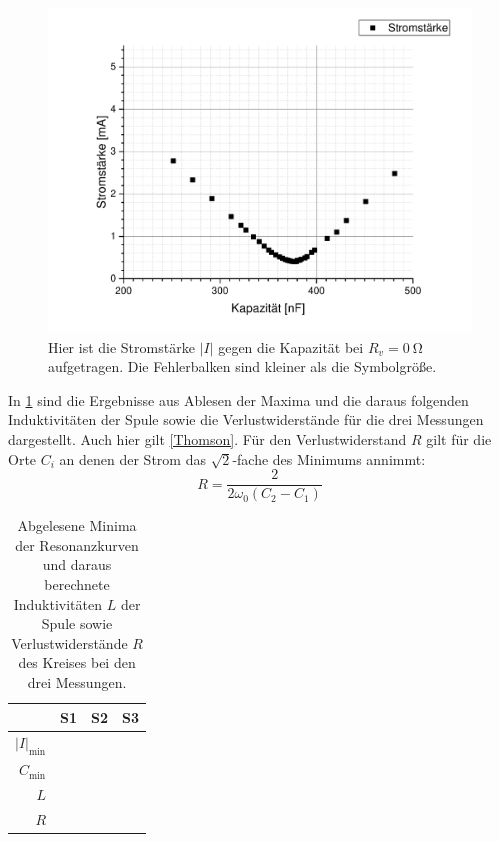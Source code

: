 \documentclass[
	a4paper,
	12pt,
	pagesize,
	ngerman
]{scrartcl}
\begin{document}
	\begin{figure}[H]
		\includegraphics[width=1\textwidth]{Parallelstromkreis_inf}
		\centering
		\caption{Hier ist die Stromstärke $ \left| I \right| $ gegen die Kapazität bei $ R_v = \SI{0}{\ohm} $ aufgetragen. Die Fehlerbalken sind kleiner als die Symbolgröße.}
		\label{Para_inf}
		\centering
	\end{figure}
	
	In \cref{Para_Erg} sind die Ergebnisse aus Ablesen der Maxima und die daraus folgenden Induktivitäten der Spule sowie die Verlustwiderstände für die drei Messungen dargestellt.
	Auch hier gilt \cref{Thomson}.
	Für den Verlustwiderstand $R$ gilt für die Orte $C_i$ an denen der Strom das $ \sqrt{2} $-fache des Minimums annimmt:
	\begin{equation}
	R= \frac{2}{2\omega_0 \left( C_2 - C_1 \right)}
	\end{equation}
	
	\begin{table}[tb]
		\centering
		\begin{tabular}{ r | c | c | c }
			&S1 & S2 & S3 \\ \hline
			$  \left| I \right|_\text{min}$ & & & \\ %
			$C_\text{min}$ & & & \\
			$L$ & & & \\
			$R$ & & & \\
		\end{tabular}
		\caption{Abgelesene Minima der Resonanzkurven und daraus berechnete Induktivitäten $L$ der Spule sowie Verlustwiderstände $R$ des Kreises bei den drei Messungen.}
		\label{Para_Erg} 
	\end{table}
\end{document}
